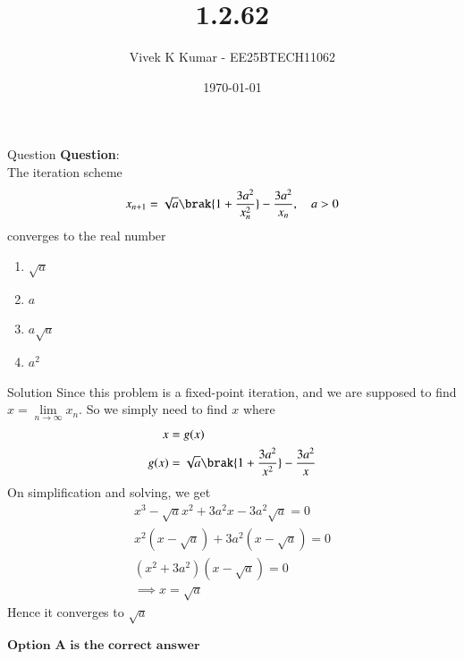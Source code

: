 \documentclass{beamer}
\title 
{1.2.62}
\date{\today}
\author 
{Vivek K Kumar - EE25BTECH11062}
\begin{document}
\frame{\titlepage}

\begin{frame}{Question}
\textbf{Question}:\\
The iteration scheme
\begin{align}
    x_{n+1} = \sqrt{a}\brak{1+\frac{3a^2}{x_n^2}} - \frac{3a^2}{x_n}, \quad a>0
\end{align}
converges to the real number
\begin{enumerate}
    \item $\sqrt{a}$
    \item $a$
    \item $a\sqrt{a}$
    \item $a^2$
\end{enumerate}
\end{frame}

\begin{frame}{Solution}
Since this problem is a fixed-point iteration, and we are supposed to find $x = \lim\limits_{n\to\infty} x_n$. So we simply need to find $x$ where
\begin{align}
    x &= g(x) \label{eq:1} \\
    g(x) &= \sqrt{a}\brak{1+\frac{3a^2}{x^2}} - \frac{3a^2}{x}
\end{align}
On simplification and solving, we get
\begin{align}
    x^3 -\sqrt{a}x^2 + 3a^2x - 3a^2\sqrt{a} = 0\\
    x^2(x-\sqrt{a}) + 3a^2(x-\sqrt{a})=0\\
    (x^2+3a^2)(x-\sqrt{a}) =0 \\
    \implies x= \sqrt{a} \label{eq:3}
\end{align}
Hence it converges to $\sqrt{a}$

\begin{center}
$\boxed{\textbf{Option A is the correct answer}}$
\end{center}
\end{frame}
\end{document}
